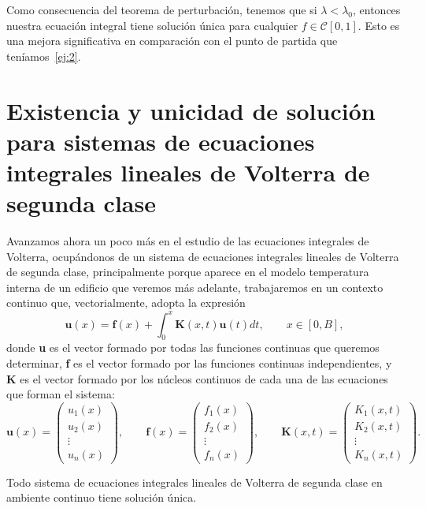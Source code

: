 \begin{ejemplo}
	Como consecuencia del teorema de perturbación, tenemos que si $\lambda < \lambda_0$, entonces nuestra ecuación integral tiene solución única para cualquier $f \in \mathcal{C}[0,1]$. Esto es una mejora significativa en comparación con el punto de partida que teníamos~\eqref{ej:2}.
\end{ejemplo}
\section{Existencia y unicidad de solución para sistemas de ecuaciones integrales lineales de Volterra de segunda clase}
Avanzamos ahora un poco más en el estudio de las ecuaciones integrales de Volterra, ocupándonos de un sistema de ecuaciones integrales lineales de Volterra de segunda clase, principalmente porque aparece en el modelo temperatura interna de un edificio que veremos más adelante, trabajaremos en un contexto continuo que, vectorialmente, adopta la expresión 
\begin{equation}
	\textbf{u}(x) = \textbf{f}(x) + \int_0^x \textbf{K}(x,t)\textbf{u}(t)dt, \qquad x \in [0,B],
\end{equation}
donde \textbf{u} es el vector formado por todas las funciones continuas que queremos determinar, \textbf{f} es el vector formado por las funciones continuas independientes, y \textbf{K} es el vector formado por los núcleos continuos de cada una de las ecuaciones que forman el sistema:
\begin{equation}
	\textbf{u}(x) = \begin{pmatrix}	u_1(x) \\ u_2(x) \\ \vdots \\ u_n(x)	\end{pmatrix}, \qquad \textbf{f}(x) = \begin{pmatrix}	f_1(x) \\ f_2(x) \\ \vdots \\ f_n(x)	\end{pmatrix}, \qquad \textbf{K}(x,t) = \begin{pmatrix}	K_1(x,t) \\ K_2(x,t) \\ \vdots \\ K_n(x,t)	\end{pmatrix}.
\end{equation}
\begin{corolario}
	Todo sistema de ecuaciones integrales lineales de Volterra de segunda clase en ambiente continuo tiene solución única.
\end{corolario}
